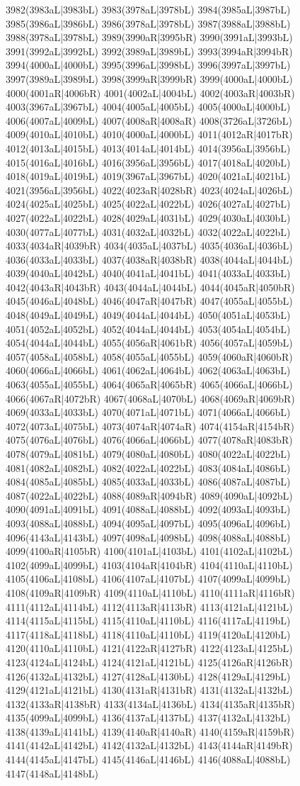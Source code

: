 3982(3983aL|3983bL) 3983(3978aL|3978bL) 3984(3985aL|3987bL) 3985(3986aL|3986bL) 3986(3978aL|3978bL) 3987(3988aL|3988bL) 3988(3978aL|3978bL) 3989(3990aR|3995bR) 3990(3991aL|3993bL) 3991(3992aL|3992bL) 3992(3989aL|3989bL) 3993(3994aR|3994bR) 3994(4000aL|4000bL) 3995(3996aL|3998bL) 3996(3997aL|3997bL) 3997(3989aL|3989bL) 3998(3999aR|3999bR) 3999(4000aL|4000bL) 4000(4001aR|4006bR) 4001(4002aL|4004bL) 4002(4003aR|4003bR) 4003(3967aL|3967bL) 4004(4005aL|4005bL) 4005(4000aL|4000bL) 4006(4007aL|4009bL) 4007(4008aR|4008aR) 4008(3726aL|3726bL) 4009(4010aL|4010bL) 4010(4000aL|4000bL) 4011(4012aR|4017bR) 4012(4013aL|4015bL) 4013(4014aL|4014bL) 4014(3956aL|3956bL) 4015(4016aL|4016bL) 4016(3956aL|3956bL) 4017(4018aL|4020bL) 4018(4019aL|4019bL) 4019(3967aL|3967bL) 4020(4021aL|4021bL) 4021(3956aL|3956bL) 4022(4023aR|4028bR) 4023(4024aL|4026bL) 4024(4025aL|4025bL) 4025(4022aL|4022bL) 4026(4027aL|4027bL) 4027(4022aL|4022bL) 4028(4029aL|4031bL) 4029(4030aL|4030bL) 4030(4077aL|4077bL) 4031(4032aL|4032bL) 4032(4022aL|4022bL) 4033(4034aR|4039bR) 4034(4035aL|4037bL) 4035(4036aL|4036bL) 4036(4033aL|4033bL) 4037(4038aR|4038bR) 4038(4044aL|4044bL) 4039(4040aL|4042bL) 4040(4041aL|4041bL) 4041(4033aL|4033bL) 4042(4043aR|4043bR) 4043(4044aL|4044bL) 4044(4045aR|4050bR) 4045(4046aL|4048bL) 4046(4047aR|4047bR) 4047(4055aL|4055bL) 4048(4049aL|4049bL) 4049(4044aL|4044bL) 4050(4051aL|4053bL) 4051(4052aL|4052bL) 4052(4044aL|4044bL) 4053(4054aL|4054bL) 4054(4044aL|4044bL) 4055(4056aR|4061bR) 4056(4057aL|4059bL) 4057(4058aL|4058bL) 4058(4055aL|4055bL) 4059(4060aR|4060bR) 4060(4066aL|4066bL) 4061(4062aL|4064bL) 4062(4063aL|4063bL) 4063(4055aL|4055bL) 4064(4065aR|4065bR) 4065(4066aL|4066bL) 4066(4067aR|4072bR) 4067(4068aL|4070bL) 4068(4069aR|4069bR) 4069(4033aL|4033bL) 4070(4071aL|4071bL) 4071(4066aL|4066bL) 4072(4073aL|4075bL) 4073(4074aR|4074aR) 4074(4154aR|4154bR) 4075(4076aL|4076bL) 4076(4066aL|4066bL) 4077(4078aR|4083bR) 4078(4079aL|4081bL) 4079(4080aL|4080bL) 4080(4022aL|4022bL) 4081(4082aL|4082bL) 4082(4022aL|4022bL) 4083(4084aL|4086bL) 4084(4085aL|4085bL) 4085(4033aL|4033bL) 4086(4087aL|4087bL) 4087(4022aL|4022bL) 4088(4089aR|4094bR) 4089(4090aL|4092bL) 4090(4091aL|4091bL) 4091(4088aL|4088bL) 4092(4093aL|4093bL) 4093(4088aL|4088bL) 4094(4095aL|4097bL) 4095(4096aL|4096bL) 4096(4143aL|4143bL) 4097(4098aL|4098bL) 4098(4088aL|4088bL) 4099(4100aR|4105bR) 4100(4101aL|4103bL) 4101(4102aL|4102bL) 4102(4099aL|4099bL) 4103(4104aR|4104bR) 4104(4110aL|4110bL) 4105(4106aL|4108bL) 4106(4107aL|4107bL) 4107(4099aL|4099bL) 4108(4109aR|4109bR) 4109(4110aL|4110bL) 4110(4111aR|4116bR) 4111(4112aL|4114bL) 4112(4113aR|4113bR) 4113(4121aL|4121bL) 4114(4115aL|4115bL) 4115(4110aL|4110bL) 4116(4117aL|4119bL) 4117(4118aL|4118bL) 4118(4110aL|4110bL) 4119(4120aL|4120bL) 4120(4110aL|4110bL) 4121(4122aR|4127bR) 4122(4123aL|4125bL) 4123(4124aL|4124bL) 4124(4121aL|4121bL) 4125(4126aR|4126bR) 4126(4132aL|4132bL) 4127(4128aL|4130bL) 4128(4129aL|4129bL) 4129(4121aL|4121bL) 4130(4131aR|4131bR) 4131(4132aL|4132bL) 4132(4133aR|4138bR) 4133(4134aL|4136bL) 4134(4135aR|4135bR) 4135(4099aL|4099bL) 4136(4137aL|4137bL) 4137(4132aL|4132bL) 4138(4139aL|4141bL) 4139(4140aR|4140aR) 4140(4159aR|4159bR) 4141(4142aL|4142bL) 4142(4132aL|4132bL) 4143(4144aR|4149bR) 4144(4145aL|4147bL) 4145(4146aL|4146bL) 4146(4088aL|4088bL) 4147(4148aL|4148bL) 